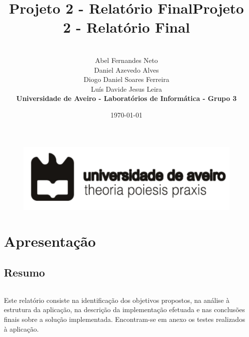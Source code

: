 \documentclass[11pt,openany,twoside]{report}
\title{\textbf{Projeto 2 - Relatório Final}}
\begin{document}
\begin{titlepage}
\begin{figure}
\title{\textbf{Projeto 2 - Relatório Final}}
\author{\\\vspace{0.3cm}
Abel Fernandes Neto
\\\vspace{0.3cm}
Daniel Azevedo Alves
\\\vspace{0.3cm}
Diogo Daniel Soares Ferreira
\\\vspace{0.3cm} 
Luís Davide Jesus Leira
\\\vspace{0.3cm}
\textbf{Universidade de Aveiro - Laboratórios de Informática - Grupo 3}}
\date{\today}
 \includegraphics[scale=1.5]{ua_logo.png}
\end{figure}
\end{titlepage}

\maketitle
\tableofcontents
\listoffigures

\part{Apresentação}

\chapter{Resumo}
\paragraph{ } Este relatório consiste na identificação dos objetivos propostos, na análise à estrutura da aplicação, na descrição da implementação efetuada e nas conclusões finais sobre a solução implementada. Encontram-se em anexo os testes realizados à aplicação. 
\end{document}
